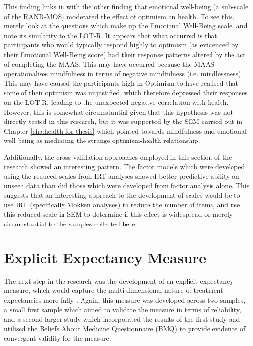 This finding links in with the other finding that emotional well-being
(a sub-scale of the RAND-MOS) moderated the effect of optimism on
health. To see this, merely look at the questions which make up the
Emotional Well-Being scale, and note its similarity to the LOT-R. It
appears that what occurred is that participants who would typically
respond highly to optimism (as evidenced by their Emotional Well-Being
score) had their response patterns altered by the act of completing
the MAAS. This may have occurred because the MAAS operationalises
mindfulness in terms of negative mindfulness (i.e. mindlessness). This
may have caused the participants high in Optimism to have realised
that some of their optimism was unjustified, which therefore depressed
their responses on the LOT-R, leading to the unexpected negative
correlation with health. However, this is somewhat circumstantial
given that this hypothesis was not directly tested in this research,
but it was supported by the SEM carried out in Chapter
\ref{cha:health-for-thesis} which pointed towards mindfulness and
emotional well being as mediating the strange optimism-health
relationship.

Additionally, the cross-validation approaches employed in this section
of the research showed an interesting pattern. The factor models which
were developed using the reduced scales from IRT analyses showed
better predictive ability on unseen data than did those which were
developed from factor analysis alone. This suggests that an
interesting approach to the development of scales would be to use IRT
(specifically Mokken analyses) to reduce the number of items, and use
this reduced scale in SEM to determine if this effect is widespread or
merely circumstantial to the samples collected here.

\section{Explicit Expectancy Measure}
\label{sec:expl-expect-meas}

The next step in the research was the development of an explicit
expectancy measure, which would capture the multi-dimensional nature
of treatment expectancies more fully \cite{Stone2005}. Again, this
measure was developed across two samples, a small first sample which
aimed to validate the measure in terms of reliability, and a second
larger study which incorporated the results of the first study and
utilised the Beliefs About Medicine Questionnaire (BMQ)
\cite{Horne1999} to provide evidence of convergent validity for the
measure.

